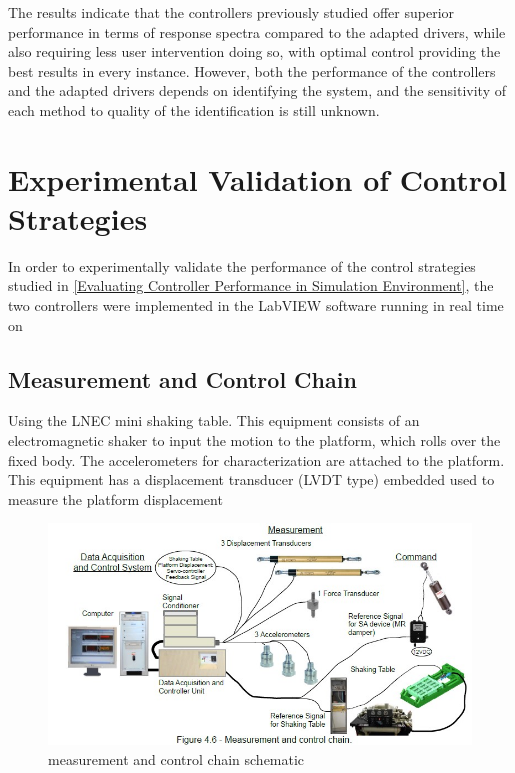 \documentclass[9pt]{extarticle}
\begin{document}
The results indicate that the controllers previously studied offer superior performance in terms of response spectra compared to the adapted drivers, while also requiring less user intervention doing so, with optimal control providing the best results in every instance. However, both the performance of the controllers and the adapted drivers depends on identifying the system, and the sensitivity of each method to quality of the identification is still unknown.


\section{Experimental Validation of Control Strategies}
In order to experimentally validate the performance of the control strategies studied in \ref{Evaluating Controller Performance in Simulation Environment}, the two controllers were implemented in the LabVIEW software running in real time on 


\subsection{ Measurement and Control Chain }%
Using the LNEC mini shaking table. This equipment consists of an electromagnetic shaker to input the motion to the platform, which rolls over the fixed body.
The accelerometers for characterization are attached to the platform. This equipment has a
displacement transducer (LVDT type) embedded used to measure the platform displacement

\begin{figure}[H]
    \centering
    \includegraphics[width=1\linewidth]{measurement_and_control_chain_schematic.jpg}
    \caption{measurement and control chain schematic}
    \label{measurement_and_control_chain_schematic}
\end{figure}
\end{document}
